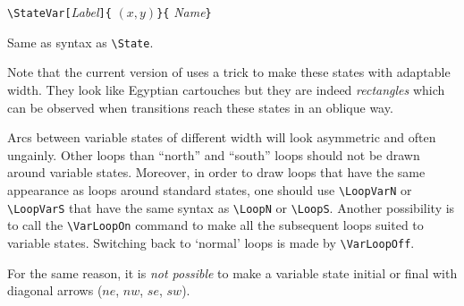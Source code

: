 \documentclass[11pt,twoside]{article}
\newlength{\ColoText}%
\newlength{\ColoFigu}%
\newlength{\parindenttemp} %
\newcommand{\noi}{\noindent}
\newlength{\jsIndent}%
\begin{document}
\hspace*{-\jsIndent}
\begin{minipage}[t]{\ColoText}
        \par\vspace*{0mm}%
        \footnotesize
\verb+\StateVar[+\textsl{Label}\verb+]{+%
   $(x,y)$\verb+}{+%
   \textsl{Name}\verb+}+
\normalsize
\end{minipage}%
\hspace*{1.2em}%
\begin{minipage}[t]{\ColoFigu}%
\par\vspace*{0mm}%
Same as syntax as \verb+\State+.
\end{minipage}%


\noi
Note that the current version of \VCSG uses a trick to make these 
states with adaptable width.
They look like Egyptian cartouches but they are indeed 
\emph{rectangles} which can be observed when transitions reach these 
states in an oblique way.

Arcs between variable states of different width will look asymmetric 
and often ungainly.
Other loops than ``north'' and ``south'' loops should not be drawn 
around variable states. Moreover, in order to draw loops that have the same appearance as loops
around standard states, one should use 
\verb+\LoopVarN+ or \verb+\LoopVarS+
that have the same syntax as \verb+\LoopN+ or \verb+\LoopS+.
Another possibility is to call the \verb+\VarLoopOn+ command to make 
all the subsequent loops suited to variable states.
Switching back to `normal' loops is made by \verb+\VarLoopOff+.

For the same reason, it is \emph{not possible} to make a variable
state initial or final with diagonal arrows ($ne$, $nw$, $se$, $sw$).


\medskip 
\end{document}
